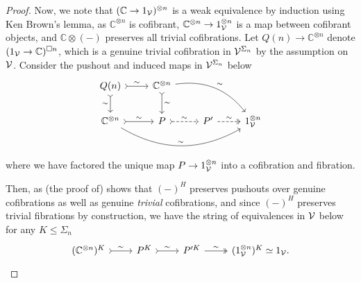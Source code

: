 \documentclass[a4paper,10pt
,draft
]{article}%
\renewcommand{\1}{\ensuremath{\mathbb{id}}}
\begin{document}
\begin{proof}
      Now,
      we note that $(\mathbb C \to 1_{\mathcal V})^{\otimes n}$ is a weak equivalence by induction using Ken Brown's lemma,
      as $\mathbb C^{\otimes n}$ is cofibrant,
      $\mathbb C^{\otimes n} \to 1_{\mathcal V}^{\otimes n}$ is a map between cofibrant objects,
      and $\mathbb C \otimes (-)$ preserves all trivial cofibrations.
      Let $Q(n) \to \mathbb C^{\otimes n}$ denote $(1_{\mathcal V} \to \mathbb C)^{\square n}$,
      which is a genuine trivial cofibration in $\mathcal V^{\Sigma_n}$ by the assumption on $\mathcal V$.
      Consider the pushout and induced maps in $\mathcal V^{\Sigma_n}$ below
      \begin{equation}
            \begin{tikzcd}
                  Q(n) \arrow[r, tail, "\sim"] \arrow[d, tail, "\sim"']
                  &
                  \mathbb C^{\otimes n} \arrow[d, tail, "\sim"] \arrow[drr, bend left, "\sim"]
                  \\
                  \mathbb C^{\otimes n} \arrow[r, tail, "\sim"] \arrow[rrr, bend right, "\sim"]
                  &
                  P \arrow[r, tail, dashed, "\sim"]
                  &
                  P' \arrow[r, two heads, "\sim", dashed]
                  &
                  1_\V^{\otimes n}
            \end{tikzcd}
      \end{equation}
      where we have factored the unique map $P \to 1_{\mathcal V}^{\otimes n}$ into a cofibration and fibration.

      Then, as (the proof of) \cite[Prop 6.3]{BP17} shows that $(-)^H$ preserves pushouts over genuine cofibrations
      as well as genuine \textit{trivial} cofibrations,
      and since $(-)^H$ preserves trivial fibrations by construction,
      we have the string of equivalences in $\mathcal V$ below for any $K \leq \Sigma_n$
      \begin{equation}
            \begin{tikzcd}
                  (\mathbb C^{\otimes n})^K \arrow[r, tail, "\sim"]
                  &
                  P^K \arrow[r, tail, "\sim"]
                  &
                  P'^K \arrow[r, two heads, "\sim"]
                  &
                  (1_\V^{\otimes n})^K \simeq 1_\V.
            \end{tikzcd}
      \end{equation}
\end{proof}
\end{document}
